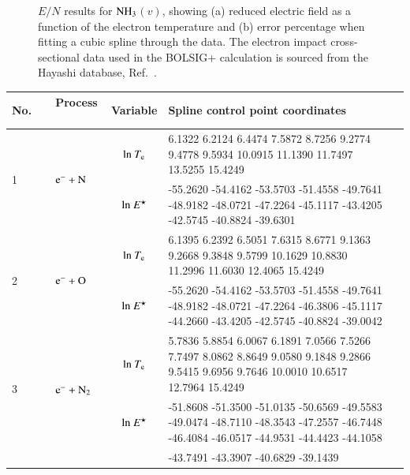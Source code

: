 \begin{figure}[!htbp]
\caption{$E/N$ results for $\rm NH_3$$(v)$, showing (a) reduced electric field as a function of the electron temperature and (b) error percentage when fitting a cubic spline through the data. The electron impact cross-sectional data used in the BOLSIG+ calculation is sourced from the Hayashi database, Ref.\ \cite{springer:1987:hayashi}.}
\label{fig:electronimpact_NH3v}
\end{figure}
%



\begin{table}[!htbp]
  \center{}
  \begin{threeparttable}
    \label{tab:spline_tab}
    \begin{tabular*}{\textwidth}{l@{\extracolsep{\fill}}lcll}
    \toprule
   No.~~ & Process ~& Variable & Spline control point coordinates  \\
        \midrule

        

  \multirow{2}{*}{1} &  \multirow{2}{*}{ $\rm e^- + N  $   } & ${\rm ln}~T_{\rm e}$  & \tiny      6.1322    6.2124    6.4474    7.5872    8.7256    9.2774    9.4778    9.5934   10.0915   11.1390   11.7497   13.5255   15.4249
 \\
  &  & ${\rm ln}~E^\star$     & \tiny -55.2620  -54.4162  -53.5703  -51.4558  -49.7641  -48.9182  -48.0721  -47.2264  -45.1117  -43.4205  -42.5745  -40.8824  -39.6301\\     
  \midrule  
      
  \multirow{2}{*}{2} &  \multirow{2}{*}{ $\rm e^- + O  $   } & ${\rm ln}~T_{\rm e}$  & \tiny    6.1395    6.2392    6.5051    7.6315    8.6771    9.1363    9.2668    9.3848    9.5799   10.1629   10.8830   11.2996   11.6030   12.4065   15.4249 \\
  &  & ${\rm ln}~E^\star$     & \tiny  -55.2620  -54.4162  -53.5703  -51.4558  -49.7641  -48.9182  -48.0721  -47.2264  -46.3806  -45.1117  -44.2660  -43.4205  -42.5745  -40.8824  -39.0042\\     
  \midrule    
  
  \multirow{2}{*}{3} &  \multirow{2}{*}{ $\rm e^- + N_2 $   } & ${\rm ln}~T_{\rm e}$  & \tiny      5.7836    5.8854    6.0067    6.1891    7.0566    7.5266    7.7497    8.0862    8.8649    9.0580    9.1848    9.2866    9.5415    9.6956    9.7646   10.0010   10.6517   12.7964   15.4249
\\
  &  & ${\rm ln}~E^\star$     & \tiny     -51.8608  -51.3500  -51.0135  -50.6569  -49.5583  -49.0474  -48.7110  -48.3543  -47.2557  -46.7448  -46.4084  -46.0517  -44.9531  -44.4423  -44.1058  
 \\     
  &  &       & \tiny     -43.7491  -43.3907  -40.6829  -39.1439\\
  \midrule  
  

\end{tabular*}
\end{threeparttable}
\end{table}
